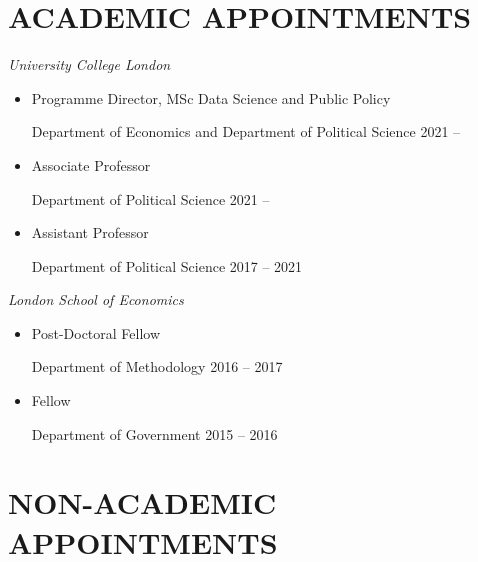 \documentclass[centered]{res}
\begin{document}
 
\address{Department of Political Science \\ University College London\\ Gower Street \\ London \\ WC1E 6BT }

\address{\faEnvelope \hfil \textcolor{white}{hi}\href{mailto:j.blumenau@ucl.ac.uk}{j.blumenau@ucl.ac.uk} \\ \faHome \hfil\href{http://www.jackblumenau.com}{jackblumenau.com} }%

 
\begin{resume}

\section{ACADEMIC APPOINTMENTS} 

\vspace{.5cm}

\emph{University College London}

\begin{itemize}
\item Programme Director, MSc Data Science and Public Policy

Department of Economics and Department of Political Science \hfill 2021 --

\item Associate Professor

Department of Political Science \hfill 2021 --

\item Assistant Professor

Department of Political Science \hfill 2017 -- 2021
\end{itemize}

\emph{London School of Economics}

\begin{itemize}
\item Post-Doctoral Fellow

Department of Methodology \hfill 2016 -- 2017

\item Fellow

Department of Government \hfill 2015 -- 2016

\end{itemize}

\section{NON-ACADEMIC APPOINTMENTS}


\end{resume}
\end{document}
